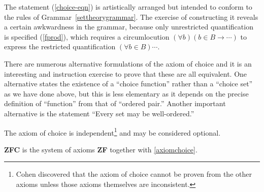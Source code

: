 \documentclass[letterpaper]{article}
\newcommand{\Axiom}{{\large\Bearing}}
\begin{document}
\begin{remark}
	The statement (\ref{choice-eqn}) is artistically arranged but intended to conform to the rules of Grammar~\ref{settheorygrammar}.  The exercise of constructing it reveals a certain awkwardness in the grammar, because only unrestricted quantification is specified (\ref{fprod}), which requires a circumlocution $(\forall b)(b\in B\longrightarrow\cdots)$ to express the restricted quantification $(\forall b\in B)\cdots$.
	
	There are numerous alternative formulations of the axiom of choice and it is an interesting and instruction exercise to prove that these are all equivalent.  One alternative states the existence of a ``choice function'' rather than a ``choice set'' as we have done above, but this is less elementary as it depends on the precise definition of ``function'' from that of ``ordered pair.''  Another important alternative is the statement ``Every set may be well-ordered.''
\end{remark}
	The axiom of choice is independent\footnote{Cohen discovered that the axiom of choice cannot be proven from the other axioms unless those axioms themselves are inconsistent.}  and may be considered optional.	
\begin{definition}
	\textbf{ZFC} is the system of axioms \textbf{ZF} together with \Axiom \ref{axiomchoice}.
\end{definition}
\end{document}
